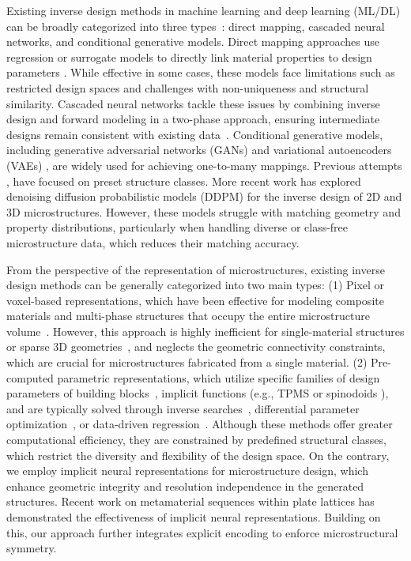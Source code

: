 Existing inverse design methods in machine learning and deep learning (ML/DL) can be broadly categorized into three types~\cite{Lee2023}: direct mapping, cascaded neural networks, and conditional generative models.
Direct mapping approaches use regression or surrogate models to directly link material properties to design parameters \cite{Li2020, wang2020DataDriven, bostanabad2019Globally, bastek2022Inverting}. While effective in some cases, these models face limitations such as restricted design spaces and challenges with non-uniqueness and structural similarity.
Cascaded neural networks tackle these issues by combining inverse design and forward modeling in a two-phase approach, ensuring intermediate designs remain consistent with existing data~\cite{Liu2018}.
Conditional generative models, including generative adversarial networks (GANs) \cite{goodfellow2020Generative} and variational autoencoders (VAEs) \cite{KingmaVAE}, are widely used for achieving one-to-many mappings. Previous attempts \cite{zheng2021Controllable, wang2022IHGAN}, \cite{Ma2019, wang2020Deep} have focused on preset structure classes. More recent work has explored denoising diffusion probabilistic models (DDPM) \cite{Ho2020DDPM} for the inverse design of 2D \cite{Wang2024} and 3D \cite{Yang2024} microstructures. However, these models struggle with matching geometry and property distributions, particularly when handling diverse or class-free microstructure data, which reduces their matching accuracy.



From the perspective of the representation of microstructures, existing inverse design methods can be generally categorized into two main types: 
(1) Pixel or voxel-based representations, which have been effective for modeling composite materials and multi-phase structures that occupy the entire microstructure volume~\cite{li2018Deep, Li2020, Hsu2020, noguchi2021Stochastic}. However, this approach is highly inefficient for single-material structures or sparse 3D geometries~\cite{Yang2024}, and neglects the geometric connectivity constraints, which are crucial for microstructures fabricated from a single material.
(2) Pre-computed parametric representations, which utilize specific families of design parameters of building blocks~\cite{wang2021DataDriven,Zheng2023,Ha2023}, implicit functions  (e.g., TPMS \cite{Li2019} or spinodoids \cite{Kumar2020}), and are typically solved through inverse searches~\cite{schumacher2015Microstructures, panetta2015Elastic}, differential parameter optimization~\cite{tozoni2020Lowparametric}, or data-driven regression~\cite{bastek2022Inverting, zheng2021Controllable, wang2022IHGAN}. Although these methods offer greater computational efficiency, they are constrained by predefined structural classes, which restrict the diversity and flexibility of the design space.
%
On the contrary, we employ implicit neural representations for microstructure design, which enhance geometric integrity and resolution independence in the generated structures. Recent work on metamaterial sequences within plate lattices \cite{Zhao2024} has demonstrated the effectiveness of implicit neural representations. Building on this, our approach further integrates explicit encoding to enforce microstructural symmetry.


